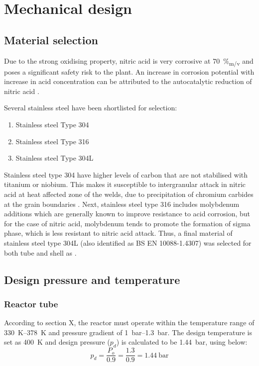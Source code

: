 \section{Mechanical design}
\subsection{Material selection}
Due to the strong oxidising property, nitric acid is very corrosive at \SI{70}{\%_{m/v}} and poses a significant safety risk to the plant. An increase in corrosion potential with increase in acid concentration can be attributed to the autocatalytic reduction of nitric acid
\cite{suresh_corrosion_nodate}. 

Several stainless steel have been shortlisted for selection: 
\begin{enumerate}
    \item Stainless steel Type 304
    \item Stainless steel Type 316
    \item Stainless steel Type 304L
\end{enumerate}

Stainless steel type 304 have higher levels of carbon that are not stabilised with titanium or niobium. This makes it susceptible to intergranular attack in nitric acid at heat affected zone of the welds, due to precipitation of chromium carbides at the grain boundaries \cite{cm_selection_nodate} . Next, stainless steel type 316 includes molybdenum additions which are generally known to improve resistance to acid corrosion, but for the case of nitric acid, molybdenum tends to promote the formation of sigma phase, which is less resistant to nitric acid attack. Thus, a final material of stainless steel type 304L (also identified as BS EN 10088-1.4307) was selected for both tube and shell as .

\subsection{Design pressure and temperature}
\subsubsection{Reactor tube}
According to section X, the reactor must operate within the temperature range of \SIrange{330}{378}{\K} and pressure gradient of \SIrange{1}{1.3}{\bar}. The design temperature is set as \SI{400}{\K} and design pressure ($p_d$) is calculated to be \SI{1.44}{\bar}, using  below:
\begin{equation}
    p_d = \frac{P_o}{0.9} = \frac{1.3}{0.9} = \SI{1.44}{\bar}
    \label{eqn:designpressure}
\end{equation}
